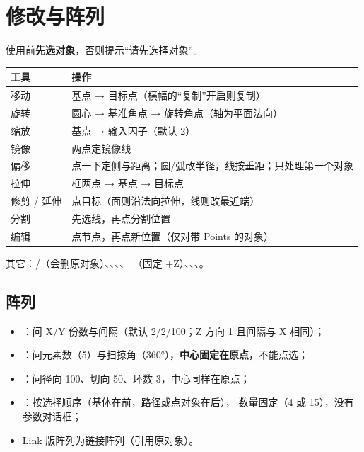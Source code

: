 \section{修改与阵列}

使用前\textbf{先选对象}，否则提示“请先选择对象”。

\begin{center}
\small
\begin{tabularx}{\linewidth}{@{}lX@{}}
\toprule
\textbf{工具} & \textbf{操作} \\
\midrule
移动 & 基点 → 目标点（横幅的“复制”开启则复制）\\
旋转 & 圆心 → 基准角点 → 旋转角点（轴为平面法向）\\
缩放 & 基点 → 输入因子（默认 2）\\
镜像 & 两点定镜像线 \\
偏移 & 点一下定侧与距离；圆/弧改半径，线按垂距；只处理第一个对象 \\
拉伸 & 框两点 → 基点 → 目标点 \\
修剪 / 延伸 & 点目标（面则沿法向拉伸，线则改最近端）\\
分割 & 先选线，再点分割位置 \\
编辑 & 点节点，再点新位置（仅对带 Points 的对象）\\
\bottomrule
\end{tabularx}
\end{center}

其它：/（会删原对象）、、、、
（固定 +Z）、、、。

\subsection{阵列}

\begin{itemize}
  \item {}：问 X/Y 份数与间隔（默认 2/2/100；Z 方向 1 且间隔与 X 相同）；
  \item {}：问元素数（5）与扫掠角（360°），\textbf{中心固定在原点}，不能点选；
  \item {}：问径向 100、切向 50、环数 3，中心同样在原点；
  \item {}：按选择顺序（基体在前，路径或点对象在后），
        数量固定（4 或 15），没有参数对话框；
  \item Link 版阵列为链接阵列（引用原对象）。
\end{itemize}

